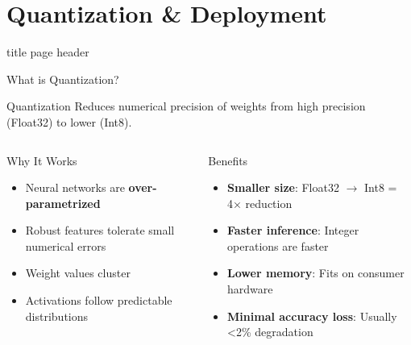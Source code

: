 \documentclass[aspectratio=169]{beamer}
\begin{document}
\section{Quantization \& Deployment}
{
\begin{frame}[plain]
  \vfill
  \centering
  \begin{beamercolorbox}[sep=8pt,center]{title page header}
    \insertsection\par
  \end{beamercolorbox}
  \vfill
\end{frame}
}

\begin{frame}{What is Quantization?}
\begin{block}{Quantization}
Reduces numerical precision of weights from high precision (Float32) to lower (Int8).
\end{block}

\begin{columns}[t]
\begin{block}{Why It Works}
\begin{itemize}
  \item Neural networks are \textbf{over-parametrized}
  \item Robust features tolerate small numerical errors
  \item Weight values cluster
  \item Activations follow predictable distributions
\end{itemize}
\end{block}

\begin{block}{Benefits}
\begin{itemize}
  \item \textbf{Smaller size}: Float32 $\rightarrow$ Int8 = 4× reduction
  \item \textbf{Faster inference}: Integer operations are faster
  \item \textbf{Lower memory}: Fits on consumer hardware
  \item \textbf{Minimal accuracy loss}: Usually <2\% degradation
\end{itemize}
\end{block}
\end{columns}

\end{frame}
\end{document}
